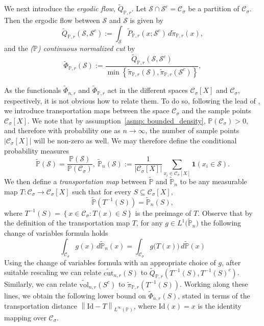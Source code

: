 \documentclass[11pt,twoside]{article}
\newcommand{\set}[1]{\left\{#1\right\}}
\newcommand{\vol}{\mathrm{vol}}
\newcommand{\cut}{\mathrm{cut}}
\newcommand{\abs}[1]{\left \lvert #1 \right \rvert}
\newcommand{\norm}[1]{\left\lVert#1\right\rVert}
\newcommand{\1}{\mathbf{1}}
\newcommand{\Xbf}{X}             %
\newcommand{\Pbb}{\mathbb{P}}
\newcommand{\Sset}{\mathcal{S}}
\newcommand{\Cset}{\mathcal{C}}
\newcommand{\Csig}{\Cset_{\sigma}}
\newcommand{\piwt}{\widetilde{\pi}}
\begin{document}
We next introduce the \emph{ergodic flow}, $\widetilde{Q}_{\Pbb,r}$. Let $\Sset \cap \Sset^c = \Csig$ be a partition of $\Csig$. Then the ergodic flow between $\Sset$ and $\Sset$ is given by 
\begin{equation*}
\widetilde{Q}_{\Pbb,r}(\Sset, \Sset^c) := \int_{\Sset} \widetilde{P}_{\Pbb,r}(x; \Sset^c) \,d\piwt_{\Pbb,r}(x), 
\end{equation*}
and the \emph{($\Pbb$) continuous normalized cut} by
\begin{equation*}
\widetilde{\Phi}_{\Pbb,r}(\Sset) := \frac{\widetilde{Q}_{\Pbb,r}(\Sset, \Sset^c)}{\min \set{\piwt_{\Pbb,r}(\Sset),\piwt_{\Pbb,r}(\Sset^c)}},
\end{equation*}

As the functionals $\widetilde{\Phi}_{n,r}$ and $\widetilde{\Phi}_{\Pbb,r}$ act in the different spaces $\Csig[\Xbf]$ and $\Csig$, respectively, it is not obvious how to relate them. To do so, following the lead of \cite{garciatrillos16}, we introduce transportation maps between the space $\Csig$ and the sample points $\Csig[\Xbf]$. We note that by assumption~\ref{asmp: bounded_density}, $\Pbb(\Csig) > 0$, and therefore with probability one as $n \to \infty$, the number of sample points $\abs{\Csig[\Xbf]}$ will be non-zero as well. We may therefore define the conditional probability measures
\begin{equation*}
\widetilde{\Pbb}(\Sset) = \frac{\Pbb(\Sset)}{\Pbb(\Csig)}, ~ \widetilde{\Pbb}_{n}(\Sset) := \frac{1}{\abs{\Csig[\Xbf]}} \sum_{x_i \in \Csig[\Xbf]} \1(x_i \in \Sset).
\end{equation*} 
We then define a \emph{transportation map} between $\widetilde{\Pbb}$ and $\widetilde{\Pbb}_n$ to be any measurable map $T: \Csig \to \Csig[\Xbf]$ such that for every $S \subseteq \Csig[\Xbf]$,
\begin{equation*}
\widetilde{\Pbb}(T^{-1}(S)) = \widetilde{\Pbb}_n(S),
\end{equation*}
where $T^{-1}(S) = \set{x \in \Csig: T(x) \in S}$ is the preimage of $T$. Observe that by the definition of the transportation map $T$, for any $g \in L^1\bigl(\widetilde{\Pbb}_n\bigr)$ the following change of variables formula holds
\begin{equation*}
\int_{\Csig} g(x) \,d\widetilde{\Pbb}_{n}(x) = \int_{\Csig} g\bigl(T(x)\bigr) \,d\widetilde{\Pbb}(x)
\end{equation*}
Using the change of variables formula with an appropriate choice of $g$, after suitable rescaling we can relate $\widetilde{\cut}_{n,r}(S)$ to $\widetilde{Q}_{\Pbb,r}(T^{-1}(S), T^{-1}(S)^c)$. Similarly, we can relate $\widetilde{\vol}_{n,r}(S^c)$ to $\widetilde{\pi}_{\Pbb,r}(T^{-1}(S))$. Working along these lines, we obtain the following lower bound on $\widetilde{\Phi}_{n,r}(S)$, stated in terms of the transportation distance $\norm{\mathrm{Id} - T}_{L^{\infty}(\Pbb)}$, where $\mathrm{Id}(x) = x$ is the identity mapping over $\Csig$.
\end{document}
